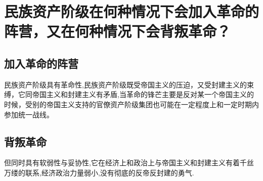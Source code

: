 \documentclass[12pt]{article}
\begin{document}
\thispagestyle{empty}
\newpage
\setcounter{page}{1}
\section{民族资产阶级在何种情况下会加入革命的阵营，又在何种情况下会背叛革命？}
\subsection{加入革命的阵营}
民族资产阶级具有革命性,民族资产阶级既受帝国主义的压迫，又受封建主义的束缚，它同帝国主义和封建主义有矛盾,当革命的锋芒主要是反对某一个帝国主义的时候，受别的帝国主义支持的官僚资产阶级集团也可能在一定程度上和一定时期内参加统一战线。
\subsection{背叛革命}
但同时具有软弱性与妥协性,它在经济上和政治上与帝国主义和封建主义有着千丝万缕的联系,经济政治力量弱小,没有彻底的反帝反封建的勇气.
\end{document}

